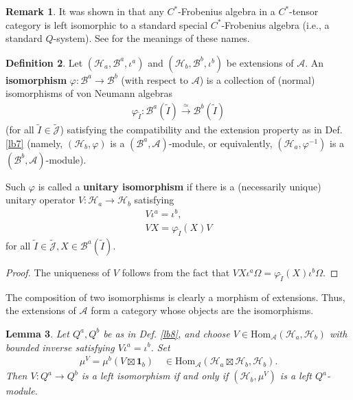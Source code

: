 \documentclass[12pt,a4paper,notitlepage]{article}
\theoremstyle{definition}
\newtheorem{df}{Definition}[section]
\newtheorem{rem}[df]{Remark}
\theoremstyle{plain}
\newtheorem{lm}[df]{Lemma}
\newcommand{\mc}{\mathcal}
\newcommand{\wtd}{\widetilde}
\newcommand{\id}{\mathbf{1}}
\newcommand{\Hom}{\mathrm{Hom}}
\newcommand{\Jtd}{\widetilde{\mathcal J}}
\numberwithin{equation}{section}
\begin{document}
\begin{rem}
It was shown in \cite[Thm. 2.9]{NY18} that any $C^*$-Frobenius algebra in a $C^*$-tensor category is left isomorphic to a standard special $C^*$-Frobenius algebra (i.e., a standard $Q$-system). See \cite{NY18} for the meanings of these names.
\end{rem}


\begin{df}
Let $(\mc H_a,\mc B^a,\iota^a)$ and $(\mc H_b,\mc B^b,\iota^b)$ be extensions of $\mc A$. An \textbf{isomorphism} $\varphi:\mc B^a\rightarrow\mc B^b$ (with respect to $\mc A$) is a collection of (normal) isomorphisms of von Neumann algebras 
\begin{align*}
\varphi_{\wtd I}:\mc B^a(\wtd I)\xrightarrow{\simeq}\mc B^b(\wtd I)	
\end{align*}
(for all $\wtd I\in\Jtd$) satisfying the compatibility and the extension property as in Def. \ref{lb7} (namely, $(\mc H_b,\varphi)$ is a $(\mc B^a,\mc A)$-module, or equivalently, $(\mc H_a,\varphi^{-1})$ is a $(\mc B^b,\mc A)$-module).

Such $\varphi$ is called a \textbf{unitary isomorphism} if there is a (necessarily unique) unitary operator $V:\mc H_a\rightarrow\mc H_b$ satisfying
\begin{gather}
V\iota^a=\iota^b,\\
V X=\varphi_{\wtd I}(X)V
\end{gather}
for all $\wtd I\in\Jtd,X\in\mc B^a(\wtd I)$.
\end{df}


\begin{proof}
The uniqueness of $V$ follows from the fact that $VX\iota^a\Omega=\varphi_{\wtd I}(X)\iota^b\Omega$.
\end{proof}


The composition of two isomorphisms is clearly a morphism of extensions. Thus, the extensions of $\mc A$ form a category whose objects are the isomorphisms.



\begin{lm}\label{lb10}
Let $Q^a,Q^b$ be as in Def. \ref{lb8}, and choose $V\in\Hom_{\mc A}(\mc H_a,\mc H_b)$ with bounded inverse satisfying $V\iota^a=\iota^b$. Set
\begin{align}
\mu^V=\mu^b(V\boxtimes\id_b)\quad \in\Hom_{\mc A}(\mc H_a\boxtimes\mc H_b,\mc H_b).
\end{align}
Then $V:Q^a\rightarrow Q^b$ is a left isomorphism if and only if $(\mc H_b,\mu^V)$ is a left $Q^a$-module.
\end{lm}
\end{document}
